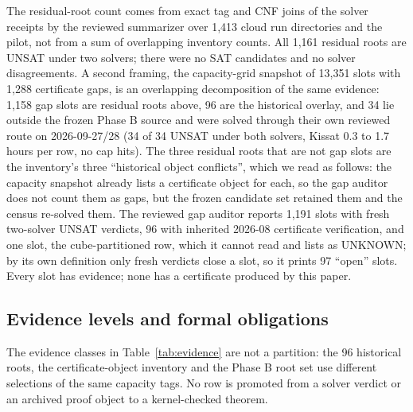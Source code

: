 \documentclass{anvil-paper}
\theoremstyle{definition}
\begin{document}
The residual-root count comes from exact tag and CNF joins of the solver receipts by the reviewed summarizer over 1,413 cloud run directories and the pilot, not from a sum of overlapping inventory counts. All 1,161 residual roots are UNSAT under two solvers; there were no SAT candidates and no solver disagreements. A second framing, the capacity-grid snapshot of 13,351 slots with 1,288 certificate gaps, is an overlapping decomposition of the same evidence: 1,158 gap slots are residual roots above, 96 are the historical overlay, and 34 lie outside the frozen Phase B source and were solved through their own reviewed route on 2026-09-27/28 (34 of 34 UNSAT under both solvers, Kissat 0.3 to 1.7 hours per row, no cap hits). The three residual roots that are not gap slots are the inventory's three ``historical object conflicts'', which we read as follows: the capacity snapshot already lists a certificate object for each, so the gap auditor does not count them as gaps, but the frozen candidate set retained them and the census re-solved them. The reviewed gap auditor reports 1,191 slots with fresh two-solver UNSAT verdicts, 96 with inherited 2026-08 certificate verification, and one slot, the cube-partitioned row, which it cannot read and lists as UNKNOWN; by its own definition only fresh verdicts close a slot, so it prints 97 ``open'' slots. Every slot has evidence; none has a certificate produced by this paper.

\subsection{Evidence levels and formal obligations}\label{sec:evidence}

The evidence classes in Table~\ref{tab:evidence} are not a partition: the 96 historical roots, the certificate-object inventory and the Phase B root set use different selections of the same capacity tags. No row is promoted from a solver verdict or an archived proof object to a kernel-checked theorem.
\end{document}

